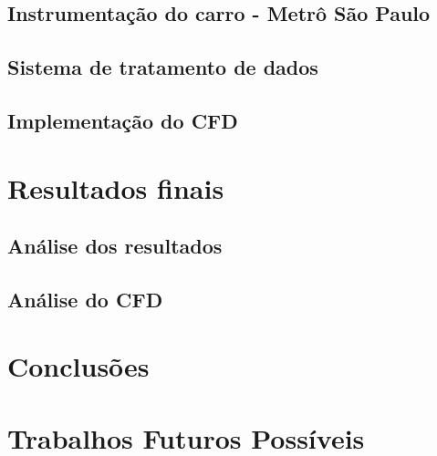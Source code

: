 \documentclass[acronym,symbols]{fei}
\begin{document}
\section{Instrumentação do carro - Metrô São Paulo}

\section{Sistema de tratamento de dados}

\section{Implementação do CFD}

\chapter{Resultados finais}

\section{Análise dos resultados}

\section{Análise do CFD}

\chapter{Conclusões}

\chapter{Trabalhos Futuros Possíveis}

\printbibliography
\end{document}

